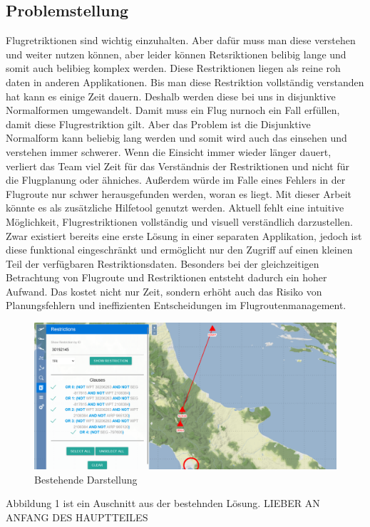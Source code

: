 \documentclass[a4paper,12pt]{article}
\begin{document}
\subsection{Problemstellung}
Flugretriktionen sind wichtig einzuhalten. Aber dafür muss man diese verstehen und weiter nutzen können, aber leider können Retsriktionen belibig lange und somit auch belibieg komplex werden. Diese Restriktionen liegen als reine roh daten in anderen Applikationen. Bis man diese Restriktion vollständig verstanden hat kann es einige Zeit dauern. Deshalb werden diese bei uns in disjunktive Normalformen umgewandelt. Damit muss ein Flug nurnoch ein Fall erfüllen, damit diese Flugrestriktion gilt. Aber das Problem ist die Disjunktive Normalform kann beliebig lang werden und somit wird auch das einsehen und verstehen immer schwerer. Wenn die Einsicht immer wieder länger dauert, verliert das Team viel Zeit für das Verständnis der Restriktionen und nicht für die Flugplanung oder ähniches. Außerdem würde im Falle eines Fehlers in der Flugroute nur schwer herausgefunden werden, woran es liegt. Mit dieser Arbeit könnte es als zusätzliche Hilfetool genutzt werden. Aktuell fehlt eine intuitive Möglichkeit, Flugrestriktionen vollständig und visuell verständlich darzustellen. Zwar existiert bereits eine erste Lösung in einer separaten Applikation, jedoch ist diese funktional eingeschränkt und ermöglicht nur den Zugriff auf einen kleinen Teil der verfügbaren Restriktionsdaten. Besonders bei der gleichzeitigen Betrachtung von Flugroute und Restriktionen entsteht dadurch ein hoher Aufwand. Das kostet nicht nur Zeit, sondern erhöht auch das Risiko von Planungsfehlern und ineffizienten Entscheidungen im Flugroutenmanagement.
\begin{figure}[H]
    \centering
\includegraphics[width=1\textwidth]{images/Bespiel1.png}
\caption{Bestehende Darstellung}
\end{figure}
Abbildung 1 ist ein Auschnitt aus der bestehnden Lösung. LIEBER AN ANFANG DES HAUPTTEILES
\end{document}
